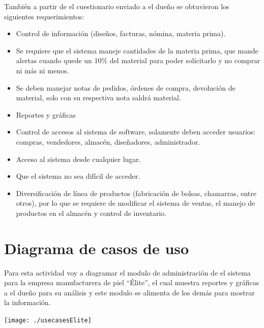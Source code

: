 \documentclass[spanish,12pt,letterpapper]{article}
\begin{document}
	También a partir de el cuestionario enviado a el dueño se obtuvieron los siguientes requerimientos:
	
	\begin{itemize}
	\item Control de información (diseños, facturas, nómina, materia prima).
	\item Se requiere que el sistema maneje cantidades de la materia prima, que mande alertas cuando quede un 10\% del material para poder solicitarlo y no comprar ni más ni menos.
	\item Se deben manejar notas de pedidos, órdenes de compra, devolución de material, solo con su respectiva nota saldrá material.
	\item Reportes y gráficas
	\item Control de accesos al sistema de software, solamente deben acceder usuarios: compras, vendedores, almacén, diseñadores, administrador.
	\item Acceso al sistema desde cualquier lugar.
	\item Que el sistema no sea difícil de acceder.
	\item Diversificación de línea de productos (fabricación de bolsas, chamarras, entre otros), por lo que se requiere de modificar el sistema de ventas, el manejo de productos en el almacén y control de inventario.
	\end{itemize}
	
	\section{Diagrama de casos de uso}
	Para esta actividad voy a diagramar el modulo de administración de el sistema para la empresa manufacturera de piel ``Élite'', el cual muestra reportes y gráficas a el dueño para su análisis y este modulo se alimenta de los demás para mostrar la información.
	
	\begin{center}
		\texttt{[image: ./usecasesElite]}~\\[1cm] 
	\end{center}
	
\end{document}
